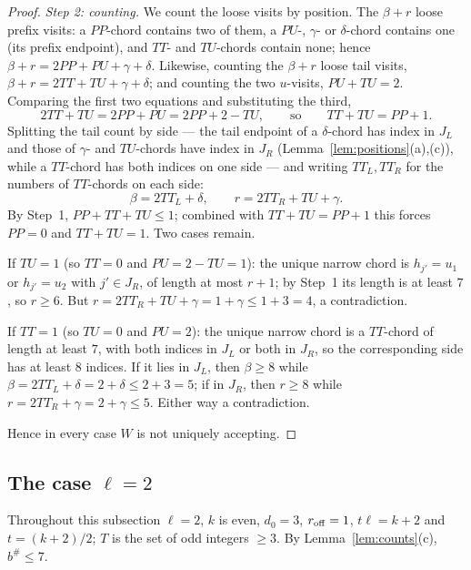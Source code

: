 \documentclass[11pt]{article}
\theoremstyle{definition}
\begin{document}
\begin{proof}
\emph{Step 2: counting.} We count the loose visits by position. The
$\beta+r$ loose prefix visits: a $PP$-chord contains two of them, a $PU$-,
$\gamma$- or $\delta$-chord contains one (its prefix endpoint), and $TT$-
and $TU$-chords contain none; hence $\beta+r=2PP+PU+\gamma+\delta$.
Likewise, counting the $\beta+r$ loose tail visits,
$\beta+r=2TT+TU+\gamma+\delta$; and counting the two $u$-visits,
$PU+TU=2$. Comparing the first two equations and substituting the third,
\[
2TT+TU=2PP+PU=2PP+2-TU,\qquad\text{so}\qquad TT+TU=PP+1 .
\]
Splitting the tail count by side --- the tail endpoint of a $\delta$-chord
has index in $J_L$ and those of $\gamma$- and $TU$-chords have index in
$J_R$ (Lemma~\ref{lem:positions}(a),(c)), while a $TT$-chord has both
indices on one side --- and writing $TT_L,TT_R$ for the numbers of
$TT$-chords on each side:
\[
\beta=2TT_L+\delta,\qquad r=2TT_R+TU+\gamma .
\]
By Step~1, $PP+TT+TU\le1$; combined with $TT+TU=PP+1$ this forces $PP=0$
and $TT+TU=1$. Two cases remain.

If $TU=1$ (so $TT=0$ and $PU=2-TU=1$): the unique narrow chord is
$h_{j'}=u_1$ or $h_{j'}=u_2$ with $j'\in J_R$, of length at most $r+1$;
by Step~1 its length is at least $7$, so $r\ge6$. But
$r=2TT_R+TU+\gamma=1+\gamma\le1+3=4$, a contradiction.

If $TT=1$ (so $TU=0$ and $PU=2$): the unique narrow chord is a $TT$-chord
of length at least $7$, with both indices in $J_L$ or both in $J_R$, so
the corresponding side has at least $8$ indices. If it lies in $J_L$, then
$\beta\ge8$ while $\beta=2TT_L+\delta=2+\delta\le2+3=5$; if in $J_R$, then
$r\ge8$ while $r=2TT_R+\gamma=2+\gamma\le5$. Either way a contradiction.

Hence in every case $W$ is not uniquely accepting.
\end{proof}

\subsection{The case \texorpdfstring{$\ell=2$}{l=2}}

Throughout this subsection $\ell=2$, $k$ is even, $d_0=3$, $r_{\rm off}=1$,
$t\ell=k+2$ and $t=(k+2)/2$; $T$ is the set of odd integers $\ge3$. By
Lemma~\ref{lem:counts}(c), $b^{\#}\le7$.
\end{document}
